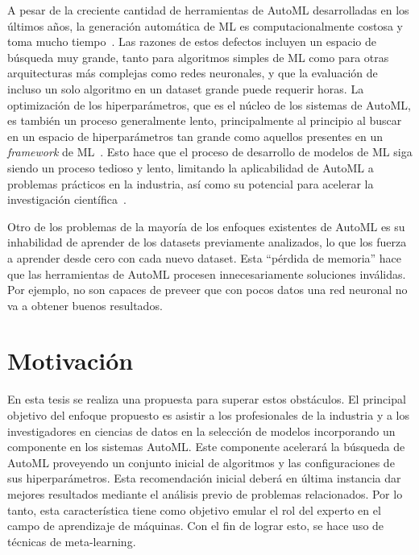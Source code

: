A pesar de la creciente cantidad de herramientas de AutoML desarrolladas en los últimos años, la generación automática de ML es computacionalmente costosa y toma mucho tiempo~\cite{crisan2021fits}. Las razones de estos defectos incluyen un espacio de búsqueda muy grande, tanto para algoritmos simples de ML como para otras arquitecturas más complejas como redes neuronales, y que la evaluación de incluso un solo algoritmo en un dataset grande puede requerir horas. La optimización de los hiperparámetros, que es el núcleo de los sistemas de AutoML, es también un proceso generalmente lento, principalmente al principio al buscar en un espacio de hiperparámetros tan grande como aquellos presentes en un \textit{framework} de ML~\cite{fuerer2015efficient}. Esto hace que el proceso de desarrollo de modelos de ML siga siendo un proceso tedioso y lento, limitando la aplicabilidad de AutoML a problemas prácticos en la industria, así como su potencial para acelerar la investigación científica~\cite{crisan2021fits}.

Otro de los problemas de la mayoría de los enfoques existentes de AutoML es su inhabilidad de aprender de los datasets previamente analizados, lo que los fuerza a aprender desde cero con cada nuevo dataset. Esta ``pérdida de memoria'' hace que las herramientas de AutoML procesen innecesariamente soluciones inválidas. Por ejemplo, no son capaces de preveer que con pocos datos una red neuronal no va a obtener buenos resultados. 



\section*{Motivación}

En esta tesis se realiza una propuesta para superar estos obstáculos. El principal objetivo del enfoque propuesto es asistir a los profesionales de la industria y a los investigadores en ciencias de datos en la selección de modelos incorporando un componente en los sistemas AutoML. Este componente acelerará la búsqueda de AutoML proveyendo un conjunto inicial de algoritmos y las configuraciones de sus hiperparámetros. Esta recomendación inicial deberá en última instancia dar mejores resultados mediante el análisis previo de problemas relacionados. Por lo tanto, esta característica tiene como objetivo emular el rol del experto en el campo de aprendizaje de máquinas. Con el fin de lograr esto, se hace uso de técnicas de meta-learning. 

